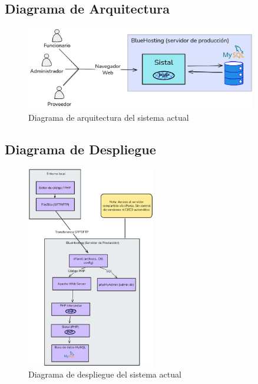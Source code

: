 \subsection{Diagrama de Arquitectura}

\begin{figure}[htbp]
    \centering
    \includegraphics[width=0.9\textwidth]{figuras/diagramas-actuales/diagrama-de-arquitectura}
    \caption{Diagrama de arquitectura del sistema actual}
    \label{fig:diagrama-arq-actual}
\end{figure}

\subsection{Diagrama de Despliegue}

\begin{figure}[htbp]
    \centering
    \includegraphics[width=0.5\textwidth]{figuras/diagramas-actuales/diagrama-de-despliegue}
    \caption{Diagrama de despliegue del sistema actual}
    \label{fig:diagrama-despliegue-actual}
\end{figure}

